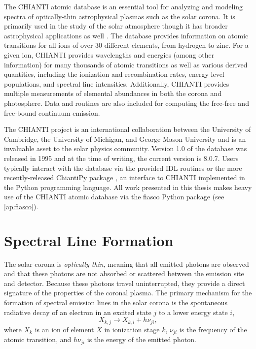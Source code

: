 The CHIANTI atomic database \citep{dere_chianti_1997,young_chianti_1998,landi_chianti_1999,dere_chianti-atomic_2001,landi_chianti-atomic_2002,young_chianti-atomic_2003,landi_chianti-atomic_2006,landi_chianti-atomic_2006-1,dere_chianti_2009,landi_chiantiatomic_2009,young_chiantiatomic_2009,landi_chiantiatomic_2012,landi_chiantiatomic_2013,del_zanna_chianti_2015,young_chianti_2016} is an essential tool for analyzing and modeling spectra of optically-thin astrophysical plasmas such as the solar corona. It is primarily used in the study of the solar atmosphere though it has broader astrophysical applications as well \citep[see Figure 4 of][]{young_chianti_2016}. The database provides information on atomic transitions for all ions of over 30 different elements, from hydrogen to zinc. For a given ion, CHIANTI provides wavelengths and energies (among other information) for many thousands of atomic transitions as well as various derived quantities, including the ionization and recombination rates, energy level populations, and spectral line intensities. Additionally, CHIANTI provides multiple measurements of elemental abundances in both the corona and photosphere. Data and routines are also included for computing the free-free and free-bound continuum emission. 

The CHIANTI project is an international collaboration between the University of Cambridge, the University of Michigan, and George Mason University and is an invaluable asset to the solar physics community. Version 1.0 of the database was released in 1995 and at the time of writing, the current version is 8.0.7. Users typically interact with the database via the provided IDL routines or the more recently-released ChiantiPy package \citep{landi_chiantiatomic_2012,barnes_chiantipy_2017}, an interface to CHIANTI implemented in the Python programming language. All work presented in this thesis makes heavy use of the CHIANTI atomic database via the fiasco Python package (see \autoref{ap:fiasco}).

\section{Spectral Line Formation}\label{sec:line_formation}

The solar corona is \textit{optically thin}, meaning that all emitted photons are observed and that these photons are not absorbed or scattered between the emission site and detector. Because these photons travel uninterrupted, they provide a direct signature of the properties of the coronal plasma. The primary mechanism for the formation of spectral emission lines in the solar corona is the spontaneous radiative decay of an electron in an excited state $j$ to a lower energy state $i$,
\begin{equation}\label{eq:radiative_decay}
    X_{k,j} \to X_{k,i} + h\nu_{ji},
\end{equation}
where $X_k$ is an ion of element $X$ in ionization stage $k$, $\nu_{ji}$ is the frequency of the atomic transition, and $h\nu_{ji}$ is the energy of the emitted photon.


